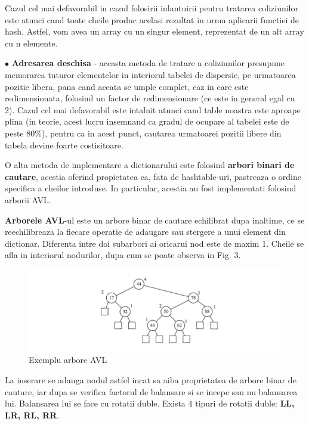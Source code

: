 \documentclass[runningheads]{llncs}
\begin{document}
Cazul cel mai defavorabil in cazul folosirii inlantuirii pentru tratarea coliziunilor este atunci cand toate cheile produc acelasi rezultat in urma aplicarii functiei de hash. Astfel, vom avea un array cu un singur element, reprezentat de un alt array cu n elemente. 
\vspace{\baselineskip}

$\bullet$ \textbf{Adresarea deschisa} - aceasta metoda de tratare a coliziunilor presupune memorarea tuturor elementelor in interiorul tabelei de dispersie, pe urmatoarea pozitie libera, pana cand aceata se umple complet, caz in care este redimensionata, folosind un factor de redimensionare (ce este in general egal cu 2). 
Cazul cel mai defavorabil este intalnit atunci cand table noastra este aproape plina (in teorie, acest lucru insemnand ca gradul de ocupare al tabelei este de peste 80$\%$), pentru ca in acest punct, cautarea urmatoarei pozitii libere din tabela devine foarte costisitoare. 

\vspace{\baselineskip}

O alta metoda de implementare a dictionarului este folosind \textbf{arbori binari de cautare}, acestia oferind propietatea ca, fata de hashtable-uri, pastreaza o ordine specifica a cheilor introduse. In particular, acestia au fost implementati folosind arborii AVL.

\textbf{Arborele AVL}-ul este un arbore binar de cautare echilibrat dupa inaltime, ce se reechilibreaza la fiecare operatie de adaugare sau stergere a unui element din dictionar. Diferenta intre doi subarbori ai oricarui nod este de maxim 1.
Cheile se afla in interiorul nodurilor, dupa cum se poate observa in Fig. 3.

\begin{figure}[ht!]
\includegraphics[width=150mm]{3.PNG}
\caption{Exemplu arbore AVL \label{overflow}}
\end{figure}

La inserare se adauga nodul astfel incat sa aiba proprietatea de arbore binar de cautare, iar dupa se verifica factorul de balansare si se incepe sau nu balansarea lui. Balansarea lui se face cu rotatii duble. Exista 4 tipuri de rotatii duble: \textbf{LL, LR, RL, RR}.
\end{document}
